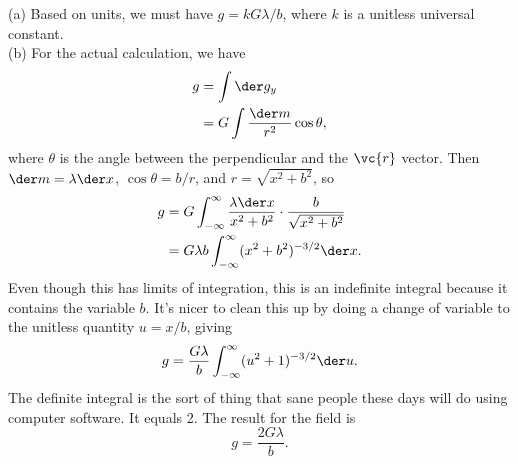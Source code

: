 (a) Based on units, we must have $g=kG\lambda/b$, where $k$ is a unitless universal constant.\\
(b) For the actual calculation, we have
\begin{align*}
  g &= \int \der g_y \\
    &= G\int \frac{\der m}{r^2} \cos\theta,
\end{align*}
where $\theta$ is the angle between the perpendicular and the $\vc{r}$ vector.
Then $\der m=\lambda \der x$, $\cos\theta=b/r$, and $r=\sqrt{x^2+b^2}$, so
\begin{align*}
  g &= G\int_{-\infty}^{\infty} \frac{\lambda \der x}{x^2+b^2} \cdot \frac{b}{\sqrt{x^2+b^2}} \\
    &= G\lambda b \int_{-\infty}^{\infty} (x^2+b^2)^{-3/2}\der x.
\end{align*}
Even though this has limits of integration, this is an indefinite integral because it contains the variable $b$.
It's nicer to clean this up by doing a change of variable to the unitless quantity $u=x/b$, giving
\begin{equation*}
  g = \frac{G\lambda}{b} \int_{-\infty}^{\infty} (u^2+1)^{-3/2}\der u.
\end{equation*}
The definite integral is the sort of thing that sane people these days will do using
computer software. It equals 2. The result for the field is
\begin{equation*}
   g = \frac{2G\lambda}{b}.
\end{equation*}
